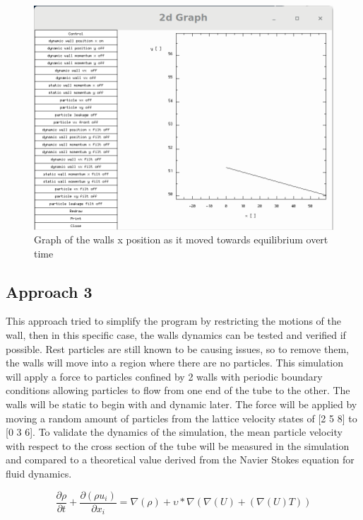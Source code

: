 \documentclass{article}
\begin{document}
\begin{figure}[H]
\includegraphics[scale=0.35]{A11p4.png}
\caption{\label{fig} Graph of the walls x position as it moved towards equilibrium overt time}
\end{figure}

\subsection{Approach 3}

This approach tried to simplify the program by restricting the motions of the wall, then in this specific case, the walls dynamics can be tested and verified if possible. Rest particles are still known to be causing issues, so to remove them, the walls will move into a region where there are no particles. This simulation will apply a force to particles confined by 2 walls with periodic boundary conditions allowing particles to flow from one end of the tube to the other. The walls will be static to begin with and dynamic later. The force will be applied by moving a random amount of particles from the lattice velocity states of [2 5 8] to [0 3 6]. To validate the dynamics of the simulation, the mean particle velocity with respect to the cross section of the tube will be measured in the simulation and compared to a theoretical value derived from the Navier Stokes equation for fluid dynamics.

\begin{equation}
\frac{\partial \rho}{\partial t} + \frac{\partial(\rho u_{i})}{\partial x_{i}} = \nabla(\rho) + \upsilon *\nabla(\nabla(U)+(\nabla(U)T))
\end{equation}
\end{document}
